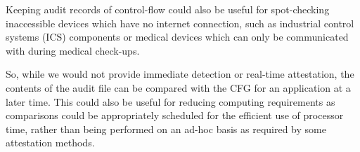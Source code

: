 Keeping audit records of control-flow could also be useful for spot-checking inaccessible devices which have no internet connection, such as industrial control systems (ICS) components or medical devices which can only be communicated with during medical check-ups.

So, while we would not provide immediate detection or real-time attestation, the contents of the audit file can be compared with the CFG for an application at a later time. This could also be useful for reducing computing requirements as comparisons could be appropriately scheduled for the efficient use of processor time, rather than being performed on an ad-hoc basis as required by some attestation methods.
